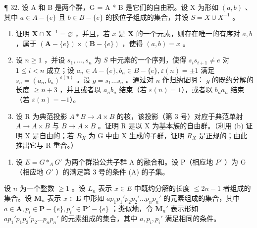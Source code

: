 ¶ 32. 设 A 和 B 是两个群，G = A * B 是它们的自由积。设 X 为形如 \((a, b)\) 、其中 \(a \in A - \{e\}\) 且 \(b \in B - \{e\}\) 的换位子组成的集合，并设 \(S = X \cup X^{-1}\) 。

\begin{enumerate}
\def\labelenumi{(\alph{enumi})}
\item
  证明 \(\mathbf{X} \cap \mathbf{X}^{-1} = \varnothing\) ，并且，若 \(x\) 是 \(\mathbf{X}\) 的一个元素，则存在唯一的有序对 \(a, b\) ，属于 \((\mathbf{A} - \{e\}) \times (\mathbf{B} - \{e\})\) ，使得 \((a, b) = x\) 。
\item
  设 \(n \geqslant 1\) ，并设 \(s_1, \ldots, s_n\) 为 \(S\) 中元素的一个序列，使得 \(s_i s_{i+1} \neq e\) 对 \(1 \leqslant i < n\) 成立；设 \(a_n \in A - \{e\}, b_n \in B - \{e\}, \varepsilon(n) = \pm 1\) 满足 \(s_n = (a_n, b_n)^{\varepsilon(n)}\) 。设 \(g = s_1 \ldots s_n\) 。通过对 \(n\) 作归纳证明： \(g\) 的既约分解的长度 \(\geqslant n + 3\) ，并且或者以 \(a_nb_n\) 结束（若 \(\varepsilon(n) = 1\)），或者以 \(b_na_n\) 结束（若 \(\varepsilon(n) = -1\)）。
\item
  设 R 为典范投影 \(A*B \rightarrow A \times B\) 的核，该投影（第 3 号）对应于典范单射 \(A \rightarrow A \times B\) 与 \(B \rightarrow A \times B\) 。证明 R 是以 X 为基本族的自由群。（利用 (b) 证明 X 是自由的；若 \(R_{X}\) 为 G 中由 X 生成的子群，证明 \(R_{X}\) 是正规的；由此推出它与 R 重合。）
\end{enumerate}

\begin{enumerate}
\def\labelenumi{\arabic{enumi}.}
\setcounter{enumi}{32}
\tightlist
\item
  设 \(E = G *_{A} G'\) 为两个群沿公共子群 A 的融合和。设 P（相应地 \(P'\) ）为 G（相应地 \(G'\) ）的满足第 3 号的条件 (A) 的子集。
\end{enumerate}

设 \(n\) 为一个整数 \(\geqslant 1\) 。设 \(L_n\) 表示 \(x \in E\) 中既约分解的长度 \(\leqslant 2n - 1\) 者组成的集合。设 \(\mathbf{M}_n\) 表示 \(x \in \mathbf{E}\) 中形如 \(ap_1p_1'p_2p_2'\ldots p_np_n'\) 的元素组成的集合，其中 \(a \in \mathbf{A}, p_i \in \mathbf{P} - \{e\}, p_i' \in \mathbf{P}' - \{e\}\) ；类似地，令 \(\mathbf{M}_n'\) 表示形如 \(ap_1'p_1p_2'p_2\ldots p_np_n'\) 的元素组成的集合，其中 \(a, p_i, p_i'\) 满足相同的条件。

